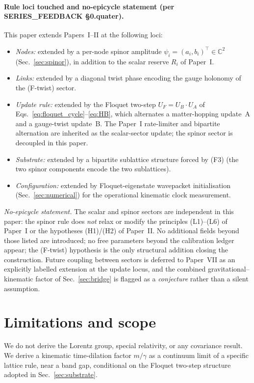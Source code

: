 \documentclass[11pt,a4paper]{article}
\begin{document}
\paragraph{Rule loci touched and no-epicycle statement (per SERIES\_FEEDBACK §0.quater).}
This paper extends Papers~I--II at the following loci:
\begin{itemize}
\item \emph{Nodes:} extended by a per-node spinor amplitude
$\psi_i = (a_i, b_i)^\top \in \mathbb{C}^2$ (Sec.~\ref{sec:spinor}),
in addition to the scalar reserve $R_i$ of Paper~I.
\item \emph{Links:} extended by a diagonal twist phase
encoding the gauge holonomy of the (F-twist) sector.
\item \emph{Update rule:} extended by the Floquet two-step
$U_F = U_B \cdot U_A$ of Eqs.~\eqref{eq:floquet_cycle}--\eqref{eq:HB},
which alternates a matter-hopping update~A and a gauge-twist
update~B. The Paper~I rate-limiter and bipartite alternation
are inherited as the scalar-sector update; the spinor sector
is decoupled in this paper.
\item \emph{Substrate:} extended by a bipartite sublattice
structure forced by (F3) (the two spinor components encode
the two sublattices).
\item \emph{Configuration:} extended by Floquet-eigenstate
wavepacket initialisation (Sec.~\ref{sec:numerical}) for the
operational kinematic clock measurement.
\end{itemize}

\noindent\emph{No-epicycle statement.} The scalar and spinor
sectors are independent in this paper: the spinor rule does
\emph{not} relax or modify the principles (L1)--(L6) of Paper~I
or the hypotheses (H1)/(H2) of Paper~II. No additional fields
beyond those listed are introduced; no free parameters beyond
the calibration ledger appear; the (F-twist) hypothesis is
the only structural addition closing the construction. Future
coupling between sectors is deferred to Paper~VII as an
explicitly labelled extension at the update locus, and the
combined gravitational--kinematic factor of
Sec.~\ref{sec:bridge} is flagged as a \emph{conjecture} rather
than a silent assumption.

\section{Limitations and scope}
\label{sec:not}

We do not derive the Lorentz group, special relativity, or any
covariance result. We derive a kinematic time-dilation factor
$m/\gamma$ as a continuum limit of a specific lattice rule,
near a band gap, conditional on the Floquet two-step structure
adopted in Sec.~\ref{sec:substrate}.
\end{document}
